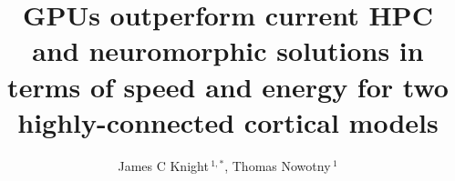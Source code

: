 \documentclass[utf8]{frontiersSCNS} %
\def\firstAuthorLast{Knight and Nowotny} %
\def\Authors{James C Knight\,$^{1,*}$, Thomas Nowotny\,$^{1}$}
\begin{document}
\onecolumn
{}

\title[GPUs outperform current SNN simulators]{GPUs
  outperform current HPC and neuromorphic solutions in terms
of speed and energy for two highly-connected cortical models} 

\author[\firstAuthorLast ]{\Authors} %
\address{} %
\correspondance{} %

\extraAuth{}%


\maketitle
\end{document}
